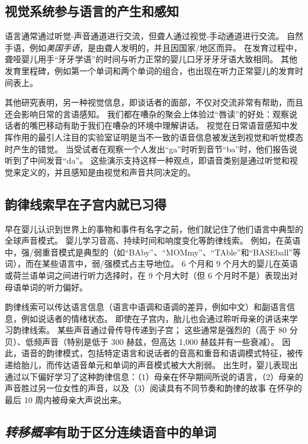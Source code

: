 \subsection{视觉系统参与语言的产生和感知}

语言通常通过听觉-声音通道进行交流，但聋人通过视觉-手动通道进行交流。
自然手语，例如\textit{美国手语}，是由聋人发明的，并且因国家/地区而异。
在发育过程中，聋哑婴儿用手“牙牙学语”的时间与听力正常的婴儿口牙牙牙牙语大致相同。
其他发育里程碑，例如第一个单词和两个单词的组合，也出现在听力正常婴儿的发育时间表上。


其他研究表明，另一种视觉信息，即谈话者的面部，不仅对交流非常有帮助，而且还会影响日常的言语感知。
我们都在嘈杂的聚会上体验过“唇读”的好处：观察说话者的嘴巴移动有助于我们在嘈杂的环境中理解讲话。
视觉在日常语音感知中发挥作用的最引人注目的实验室证明是当不一致的语音信息被发送到视觉和听觉模态时产生的错觉。
当受试者在观察一个人发出“ga”时听到音节“ba”时，他们报告说听到了中间发音“da”。
这些演示支持这样一种观点，即语音类别是通过听觉和视觉来定义的，并且感知是由视觉和声音共同决定的。



\subsection{韵律线索早在子宫内就已习得}

早在婴儿认识到世界上的事物和事件有名字之前，他们就记住了他们语言中典型的全球声音模式。
婴儿学习音高、持续时间和响度变化等韵律线索。
例如，在英语中，强/弱重音模式是典型的（如“BAby”、“MOMmy”、“TAble”和“BASEball”等词），而在某些语言中，弱/强模式占主导地位。
6 个月和 9 个月大的婴儿在英语或荷兰语单词之间进行听力选择时，在 9 个月大时（但 6 个月时不是）表现出对母语单词的听力偏好。


韵律线索可以传达语言信息（语言中语调和语调的差异，例如中文）和副语言信息，例如说话者的情绪状态。
即使在子宫内，胎儿也会通过聆听母亲的讲话来学习韵律线索。 某些声音通过骨传导传递到子宫；
这些通常是强烈的（高于 80 分贝）、低频声音（特别是低于 300 赫兹，但高达 1,000 赫兹并有一些衰减）。
因此，语音的韵律模式，包括特定语言和说话者的音高和重音和语调模式特征，被传递给胎儿，而传达语音单元和单词的声音模式被大大削弱。
出生时，婴儿表现出通过以下偏好学习了这种韵律信息：（1）母亲在怀孕期间所说的语言，（2）母亲的声音胜过另一位女性的声音，以及（3）阅读具有不同节奏和韵律的故事 在怀孕的最后 10 周内被母亲大声说出来。



\subsection{\textit{转移概率}有助于区分连续语音中的单词}

